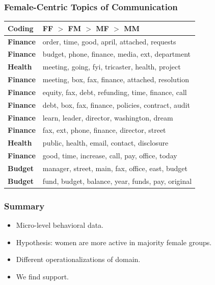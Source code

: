 \documentclass[xcolor={table}, fleqn]{beamer}
\newcommand{\female}[1]{\colorbox{female}{#1}}
\newenvironment{changemargin}[2]{%
  \begin{list}{}{%
    \setlength{\topsep}{0pt}%
    \setlength{\leftmargin}{#1}%
    \setlength{\rightmargin}{#2}%
    \setlength{\listparindent}{\parindent}%
    \setlength{\itemindent}{\parindent}%
    \setlength{\parsep}{\parskip}%
  }%
  \item[]}{\end{list}}
\begin{document}
\begin{frame}\frametitle{Female-Centric Topics of Communication}
	
	
\begin{changemargin}{-1cm}{ -1cm}	
	\centering
		\begin{tabular}{ll}
			\toprule
	Coding & FF $>$ FM $>$ MF $>$ MM\\
	\midrule

	\female{\textbf{Finance}} & order, time, good, april, attached, requests \\ 
	\female{\textbf{Finance}} & budget, phone, finance, media, ext, department
	\\ 
	\textbf{Health} & meeting, going, fyi, tricaster, health, project
	 \\ 
	\female{\textbf{Finance}} & meeting, box, fax, finance, attached, resolution
	\\ 
	\female{\textbf{Finance}} & equity, fax, debt, refunding, time, finance, call
	 \\ 
	\female{\textbf{Finance}} & debt, box, fax, finance, policies, contract, audit
	\\ 
	\female{\textbf{Finance}} & learn, leader, director, washington, dream
	\\ 
	\female{\textbf{Finance}} & fax, ext, phone, finance, director, street
	\\ 
	\textbf{Health} & public, health, email, contact, disclosure

	\\ 
	\female{\textbf{Finance}} & good, time, increase, call, pay, office, today
	
	\\ 
	\female{\textbf{Budget}} & manager, street, main, fax, office, east, budget
	
	\\ 
	\female{\textbf{Budget}} & fund, budget, balance, year, funds, pay, original
	
	\\

			\bottomrule
		\end{tabular}
		\end{changemargin}
\end{frame}






\begin{frame}\frametitle{Summary}
	\LARGE
	\begin{itemize}
		\item Micro-level behavioral data.
		\vspace*{.3in}
		\item Hypothesis: women are more active in majority female groups.
		\vspace*{.3in}
		\item Different operationalizations of domain.
		\vspace*{.3in}
		\item We find support.
	\end{itemize}
\end{frame}
\end{document}
